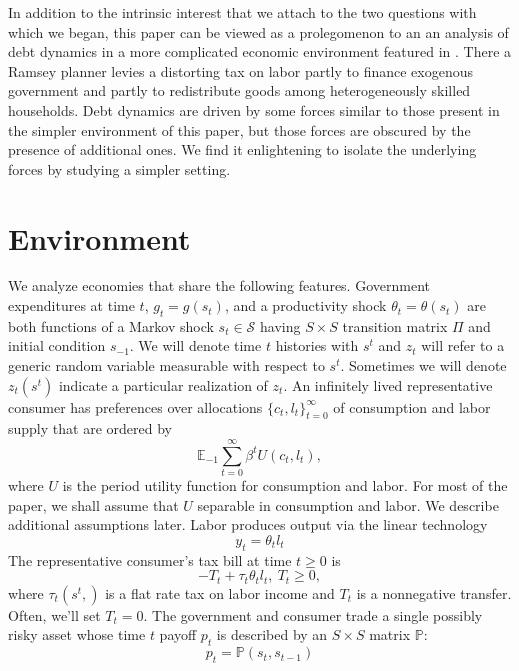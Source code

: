 \documentclass[12pt]{article}
\begin{document}
In addition to the intrinsic interest that we attach to the two questions with which we began, this paper can be viewed as
a prolegomenon to an an analysis of debt dynamics in a more complicated   economic environment featured in \citet{BEGS1}.  There
a Ramsey planner levies a distorting tax on labor partly to finance exogenous government  and partly to redistribute goods among heterogeneously skilled households.
Debt dynamics are driven by some forces similar to those present in the simpler environment of this paper, but those forces are obscured by the presence of
additional ones.  We find it enlightening to isolate the underlying forces by studying a simpler setting.

\section{Environment}



We analyze economies that share the following features.
Government expenditures at time $t$, $g_t=g(s_t)$, and a productivity shock $\theta_t=\theta(s_t)$ are both functions of
  a Markov  shock $s_t\in \mathcal{S}$ having  $S \times S$ transition matrix $\Pi$ and initial condition $s_{-1}$. We will denote time $t$ histories with $s^t$ and $z_t$ will refer to a generic random variable measurable with respect to $s^t$. Sometimes we will denote $z_t(s^t)$ indicate a particular realization of $z_t$.
 An infinitely lived representative consumer has preferences over allocations  $\{c_t, l_t\}_{t=0}^\infty$ of consumption and labor supply that are ordered
by
   \begin{equation}
   \label{eqn:obj}
\mathbb{E}_{-1}\sum_{t=0}^{\infty } \beta^t  U\left(
c_t,l_t\right),
\end{equation}%
where $U$ is the period utility function for consumption and labor.  For most of the paper,  we shall assume that $U$ separable in consumption and labor.  We describe additional assumptions later.  Labor produces output via the linear technology
  \begin{equation*}
  y_t=\theta_{t} l_{t} \end{equation*}
The representative consumer's tax bill
 at time $t \geq 0$ is
 \[- T_t + \tau_t \theta_{t}l_{t},  \ T_t \geq 0, \]
 where $\tau_t(s^t,)$ is a flat rate tax on labor income and $T_t$ is a nonnegative transfer.
 Often, we'll set $T_t =0$.
The government and consumer trade a single  possibly risky  asset whose  time $t$ payoff $p_t$ is described by an $S \times S$ matrix $\mathbb{P}$:
\[p_t=\mathbb{P}(s_{t},s_{t-1}) \]
\end{document}
